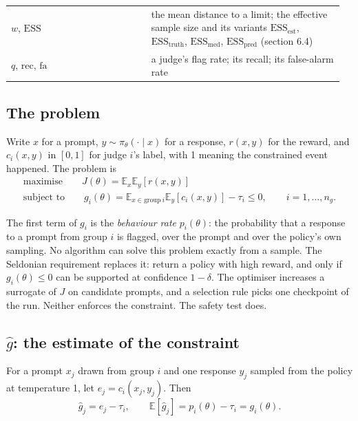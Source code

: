 \documentclass[11pt]{article}
\begin{document}
\begin{longtable}{@{}>{\raggedright\arraybackslash}p{0.406\linewidth}>{\raggedright\arraybackslash}p{0.558\linewidth}@{}}
\hspace{0pt}$w$, $\mathrm{ESS}$ & \hspace{0pt}the mean distance to a limit; the effective sample size and its variants $\mathrm{ESS}_{\mathrm{est}}$, $\mathrm{ESS}_{\mathrm{truth}}$, $\mathrm{ESS}_{\mathrm{med}}$, $\mathrm{ESS}_{\mathrm{pred}}$ (section 6.4) \\
\hspace{0pt}$q$, $\text{rec}$, $\text{fa}$ & \hspace{0pt}a judge's flag rate; its recall; its false-alarm rate \\
\end{longtable}
\endgroup

\subsection{The problem}

Write $x$ for a prompt, $y \sim \pi_{\theta} (\cdot \mid x )$ for a response, $r (x , y )$ for the reward, and $c_{i} (x , y )$ in $[0, 1]$ for judge $i$'s label, with 1 meaning the constrained event happened. The problem is
\begin{gather*}
\text{maximise}\qquad J (\theta ) = \mathbb{E}_{x} \mathbb{E}_{y} [ r (x , y ) ] \\
\text{subject to}\qquad g_{i} (\theta ) = \mathbb{E}_{x \in \text{group}\ i } \mathbb{E}_{y} [ c_{i} (x , y ) ] - \tau_{i} \le 0,\qquad i = 1,\dots,n_{g} .
\end{gather*}

The first term of $g_{i}$ is the \emph{behaviour rate} $p_{i} (\theta )$: the probability that a response to a prompt from group $i$ is flagged, over the prompt and over the policy's own sampling. No algorithm can solve this problem exactly from a sample. The Seldonian requirement replaces it: return a policy with high reward, and only if $g_{i} (\theta ) \le 0$ can be supported at confidence $1 - \delta$. The optimiser increases a surrogate of $J$ on candidate prompts, and a selection rule picks one checkpoint of the run. Neither enforces the constraint. The safety test does.


\subsection{\texorpdfstring{$\hat{g}$}{g-hat}: the estimate of the constraint}

For a prompt $x_{j}$ drawn from group $i$ and one response $y_{j}$ sampled from the policy at temperature 1, let $e_{j} = c_{i} (x_{j} , y_{j} )$. Then
\[
\hat{g}_{j} = e_{j} - \tau_{i} ,\qquad \mathbb{E} [ \hat{g}_{j} ] = p_{i} (\theta ) - \tau_{i} = g_{i} (\theta ).
\]
\end{document}

